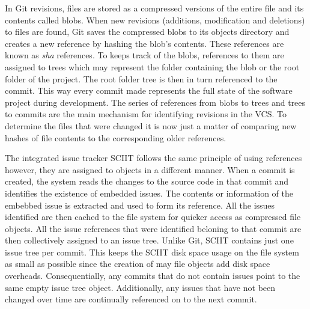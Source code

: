 \documentclass{mproj}
\begin{document}

In Git revisions, files are stored as a compressed versions of the entire file and its contents called blobs. When new revisions (additions, modification and deletions) to files are found, Git saves the compressed blobs to its objects directory and creates a new reference by hashing the blob's contents. These references are known as \textit{sha} references. To keeps track of the blobs, references to them are assigned to trees which may represent the folder containing the blob or the root folder of the project.  The root folder tree is then in turn referenced to the commit. This way every commit made represents the full state of the software project during development. The series of references from blobs to trees and trees to commits are the main mechanism for identifying revisions in the VCS. To determine the files that were changed it is now just a matter of comparing new hashes of file contents to the corresponding older references.


The integrated issue tracker SCIIT follows the same principle of using references however, they are assigned to objects in a different manner. When a commit is created, the system reads the changes to the source code in that commit and identifies the existence of embedded issues. The contents or information of the embebbed issue is extracted and used to form its reference. All the issues identified are then cached to the file system for quicker access as compressed file objects. All the issue references that were identified beloning to that commit are then collectively assigned to an issue tree. Unlike Git, SCIIT contains just one issue tree per commit. This keeps the SCIIT disk space usage on the file system as small as possible since the creation of may file objects add disk space overheads. Consequentially, any commits that do not contain issues point to the same empty issue tree object. Additionally, any issues that have not been changed over time are continually referenced on to the next commit.
\end{document}

